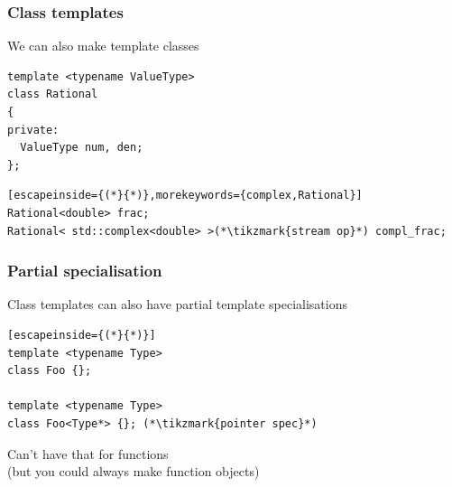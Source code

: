 \documentclass[14pt,a4paper,dvipsnames,usenames]{beamer}
\begin{document}
\begin{frame}[fragile]
  \frametitle{Class templates}

  We can also make template classes

  \vspace{.5em}
  \begin{lstlisting}[morekeywords={ValueType}]
template <typename ValueType>
class Rational
{
private:
  ValueType num, den;
};

  \end{lstlisting}
  
  \begin{lstlisting}[escapeinside={(*}{*)},morekeywords={complex,Rational}]
Rational<double> frac;
Rational< std::complex<double> >(*\tikzmark{stream op}*) compl_frac;
  \end{lstlisting}

  \nointerlineskip
  
\end{frame}

\begin{frame}[fragile]
  \frametitle{Partial specialisation}

  Class templates can also have {\color{FeebleWeek}partial} template specialisations

  \vspace{.5em}
  \begin{lstlisting}[escapeinside={(*}{*)}]
template <typename Type>
class Foo {};

template <typename Type>
class Foo<Type*> {}; (*\tikzmark{pointer spec}*)
  \end{lstlisting}

  \vspace{.5em}
  Can't have that for functions\\
  {
    (but you could always make function objects)
  }

  \nointerlineskip
  
\end{frame}
\end{document}
